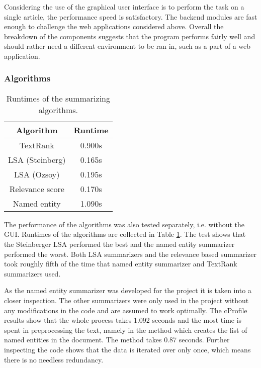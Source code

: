 \documentclass[conference]{IEEEtran}
\begin{document}
Considering the use of the graphical user interface is to perform the task on a single article, the performance speed is satisfactory. The backend modules are fast enough to challenge the web applications considered above. Overall the breakdown of the components suggests that the program performs fairly well and should rather need a different environment to be ran in, such as a part of a web application.

\subsubsection{Algorithms}
\begin{table}[!t]
	\renewcommand{\arraystretch}{1.5}
	\caption{Runtimes of the summarizing algorithms.}
	\begin{center}
		\begin{tabular}{c|c}
			\hline
			\hline
			Algorithm & Runtime  \\
			\hline
			TextRank & 0.900s \\
			LSA (Steinberg) & 0.165s \\
			LSA (Ozsoy) & 0.195s \\
			Relevance score & 0.170s \\
			Named entity & 1.090s \\
			\hline
			\hline
		\end{tabular}
		\label{algperfs}
	\end{center}
\end{table}

The performance of the algorithms was also tested separately, i.e. without the GUI. Runtimes of the algorithms are collected in Table \ref{algperfs}. The test shows that the Steinberger LSA performed the best and the named entity summarizer performed the worst. Both LSA summarizers and the relevance based summarizer took roughly fifth of the time that named entity summarizer and TextRank summarizers used.

As the named entity summarizer was developed for the project it is taken into a closer inspection. The other summarizers were only used in the project without any modifications in the code and are assumed to work optimally. The cProfile results show that the whole process takes 1.092 seconds and the most time is spent in preprocessing the text, namely in the method which creates the list of named entities in the document. The method takes 0.87 seconds. Further inspecting the code shows that the data is iterated over only once, which means there is no needless redundancy. 
\end{document}
